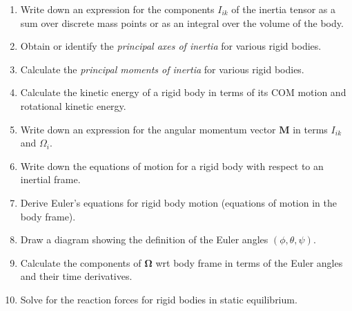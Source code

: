 \documentclass[10pt]{article}
\numberwithin{equation}{section}
\def\ben{\begin{enumerate}}
\def\een{\end{enumerate}}
\def\i{\item{}}
\newcommand{\bs}[1]{\boldsymbol{#1}}
\renewcommand{\vec}[1]{\mathbf{#1}}
\newcommand{\vecs}[1]{\bs{#1}}
\begin{document}
\ben
\i Write down an expression for the components  $I_{ik}$
of the inertia tensor as a sum over discrete mass points 
or as an integral over the volume of the body.

\i Obtain or identify the {\em principal axes of
inertia} for various rigid bodies.

\i Calculate the 
{\em principal moments of inertia} for various rigid bodies.

\i Calculate the kinetic energy of a rigid body in terms of
its COM motion and rotational kinetic energy.

\i Write down an expression for the angular 
momentum vector $\vec M$ in terms $I_{ik}$ and ${\Omega}_i$.

\i Write down the equations of motion for a rigid body with 
respect to an inertial frame.

\i Derive Euler's equations for rigid body motion (equations 
of motion in the body frame).

\i Draw a diagram showing the definition of the Euler angles
$(\phi,\theta,\psi)$.

\i Calculate the components of $\vecs{\Omega}$ wrt body 
frame in terms of the Euler angles and their time derivatives.

\i Solve for the reaction forces for rigid bodies in static equilibrium.
\een
\end{document}
